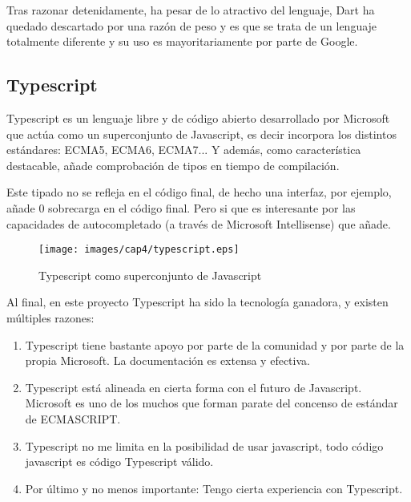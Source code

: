 \bigskip
Tras razonar detenidamente, ha pesar de lo atractivo del lenguaje, Dart ha quedado descartado por 
una razón de peso y es que se trata de un lenguaje totalmente diferente y su uso es mayoritariamente
por parte de Google.

\subsection{Typescript}

Typescript es un lenguaje libre y de código abierto desarrollado por Microsoft que actúa como un superconjunto
de Javascript, es decir incorpora los distintos estándares: ECMA5, ECMA6, ECMA7... Y además, como característica
destacable, añade comprobación de tipos en tiempo de compilación.

\bigskip
Este tipado no se refleja en el código final, de hecho una interfaz, por ejemplo,
añade 0 sobrecarga en el código final. Pero si que es interesante por las capacidades de
autocompletado (a través de Microsoft Intellisense)  que añade.

\begin{figure}[!th]
\begin{center}
\texttt{[image: images/cap4/typescript.eps]}
\caption{Typescript como superconjunto de Javascript}
\label{fig:Typescript como superconjunto de Javascript}
\end{center}
\end{figure}

\bigskip
Al final, en este proyecto Typescript ha sido la tecnología ganadora, y existen múltiples
razones:

\begin{enumerate}

\item Typescript tiene bastante apoyo por parte de la comunidad y por parte de la propia Microsoft.
La documentación es extensa y efectiva.

\item Typescript está alineada en cierta forma con el futuro de Javascript. Microsoft es uno de los 
muchos que forman parate del concenso de estándar de ECMASCRIPT.

\item Typescript no me limita en la posibilidad de usar javascript, todo código javascript es código
Typescript válido.

\item Por último y no menos importante: Tengo cierta experiencia con Typescript.
\end{enumerate}

